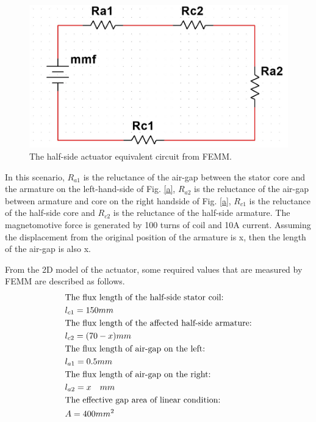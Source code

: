 \documentclass[a4paper]{IEEEtran}
\begin{document}
\begin{figure}[H]
\begin{centering}
\includegraphics[scale=0.4]{b.jpg}
\par\end{centering}   
\caption{The half-side actuator equivalent circuit from FEMM.\label{b}}
\end{figure}   
In this scenario, $ R_{a1} $ is the reluctance of the air-gap between the stator core and the armature on the left-hand-side of Fig. \ref{a}, 
$ R_{a2} $ is the reluctance of  the air-gap between armature and core on the right handside of Fig. \ref{a}, 
$ R_{c1} $ is the reluctance of the half-side core and $ R_{c2} $ is the reluctance of the half-side armature. 
The magnetomotive force is generated by 100 turns of coil and 10A current.
Assuming the displacement from the original position of the armature is x, then the length of the air-gap is also x.\par 
From the 2D model of the actuator, some required values that are measured by FEMM are described as follows.
\begin{align}
	&\text {The flux length of the half-side stator coil:}\notag \\ 
	&l_{c1} = 150mm\\
	&\text {The flux length of the affected half-side armature:}\notag \\
	&l_{c2} = (70 - x) mm\\
	&\text{The flux length of air-gap on the left:}\notag\\
	&l_{a1} = 0.5mm\\
	&\text{The flux length of air-gap on the right:}\notag\\
	&l_{a2} = x\quad mm\\
	&\text{The effective gap area of linear condition:}\notag\\
	&A = 400 mm^2
\end{align}
\end{document}
